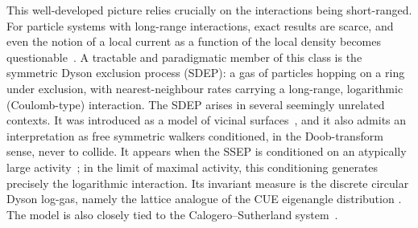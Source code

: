 \documentclass[11pt]{article}
\numberwithin{equation}{section}
\newcommand{\1}{\mathbf 1}
\begin{document}
This well-developed picture relies crucially on the interactions being
short-ranged.  For particle systems with long-range interactions, exact results
are scarce, and even the notion of a local current as a function of the local
density becomes
questionable~\cite{Garrido1990,Liggett1980,AndjelGuiol2005,GoncalvesJara2018,BelitskyNgocSchutz2024}.
A tractable and paradigmatic member of this class is the symmetric Dyson
exclusion process (SDEP): a gas of particles hopping on a ring under exclusion,
with nearest-neighbour rates carrying a long-range, logarithmic (Coulomb-type)
interaction.  
The SDEP arises in several seemingly unrelated contexts.  It was introduced as
a model of vicinal surfaces~\cite{Spohn1999vicinal}, and it also admits an
interpretation as free symmetric walkers conditioned, in the Doob-transform
sense, never to collide.  It appears when the SSEP is conditioned on an
atypically large activity~\cite{PopkovSimonSchutz2010,Schutz2015}; in the limit
of maximal activity, this conditioning generates precisely the logarithmic
interaction.  Its invariant measure is the discrete circular Dyson log-gas,
namely the lattice analogue of the CUE eigenangle distribution
\cite{Dyson1962}.  The model is also closely tied to the Calogero--Sutherland
system~\cite{Calogero1969,Sutherland1972,AbanovBettelheimWiegmann2009}.
\end{document}

